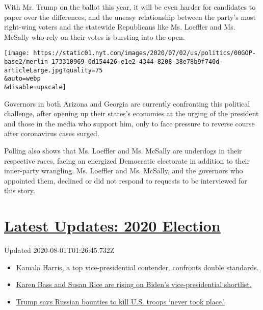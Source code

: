 With Mr. Trump on the ballot this year, it will be even harder for
candidates to paper over the differences, and the uneasy relationship
between the party's most right-wing voters and the statewide Republicans
like Ms. Loeffler and Ms. McSally who rely on their votes is bursting
into the open.

\texttt{[image: https://static01.nyt.com/images/2020/07/02/us/politics/00GOP-base2/merlin\_173310969\_0d154426-e1e2-4344-8208-38e78b9f740d-articleLarge.jpg?quality=75\\\&auto=webp\\\&disable=upscale]}

Governors in both Arizona and Georgia are currently confronting this
political challenge, after opening up their states's economies at the
urging of the president and those in the media who support him, only to
face pressure to reverse course after coronavirus cases surged.

Polling also shows that Ms. Loeffler and Ms. McSally are underdogs in
their respective races, facing an energized Democratic electorate in
addition to their inner-party wrangling. Ms. Loeffler and Ms. McSally,
and the governors who appointed them, declined or did not respond to
requests to be interviewed for this story.

\hypertarget{latest-updates-2020-election}{%
\section{\texorpdfstring{\href{https://www.nytimes.com/2020/07/31/us/elections/biden-vs-trump.html?action=click\&pgtype=Article\&state=default\&region=MAIN_CONTENT_1\&context=storylines_live_updates}{Latest
Updates: 2020
Election}}{Latest Updates: 2020 Election}}\label{latest-updates-2020-election}}

Updated 2020-08-01T01:26:45.732Z

\begin{itemize}
\tightlist
\item
  \href{https://www.nytimes.com/2020/07/31/us/elections/biden-vs-trump.html?action=click\&pgtype=Article\&state=default\&region=MAIN_CONTENT_1\&context=storylines_live_updates\#link-29fdff45}{Kamala
  Harris, a top vice-presidential contender, confronts double
  standards.}
\item
  \href{https://www.nytimes.com/2020/07/31/us/elections/biden-vs-trump.html?action=click\&pgtype=Article\&state=default\&region=MAIN_CONTENT_1\&context=storylines_live_updates\#link-13ec3d9c}{Karen
  Bass and Susan Rice are rising on Biden's vice-presidential
  shortlist.}
\item
  \href{https://www.nytimes.com/2020/07/31/us/elections/biden-vs-trump.html?action=click\&pgtype=Article\&state=default\&region=MAIN_CONTENT_1\&context=storylines_live_updates\#link-49e9a016}{Trump
  says Russian bounties to kill U.S. troops `never took place.'}
\end{itemize}

